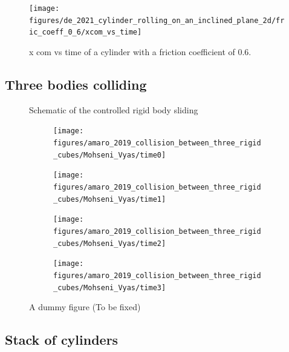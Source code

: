 \documentclass[preprint,12pt]{elsarticle}
\begin{document}
\begin{figure}[!htpb]
  \centering
  \texttt{[image: figures/de\_2021\_cylinder\_rolling\_on\_an\_inclined\_plane\_2d/fric\_coeff\_0\_6/xcom\_vs\_time]}
  \caption{x com vs time of a cylinder with a friction coefficient of $0.6$.}
\label{fig:cylinder-xcom-vs-time-fric-0-6}
\end{figure}


\FloatBarrier%
\subsection{Three bodies colliding}
\label{sec:three-bodies-colliding}


\begin{figure}[!htpb]
  \centering
  \caption{Schematic of the controlled rigid body sliding}
\label{fig:schematic-controlled-rigid-body-sliding}
\end{figure}


\begin{figure}[!htpb]
  \centering
  \begin{subfigure}{0.48\textwidth}
    \centering
    \texttt{[image: figures/amaro\_2019\_collision\_between\_three\_rigid\_cubes/Mohseni\_Vyas/time0]}
  \end{subfigure}
  \begin{subfigure}{0.48\textwidth}
    \centering
    \texttt{[image: figures/amaro\_2019\_collision\_between\_three\_rigid\_cubes/Mohseni\_Vyas/time1]}
  \end{subfigure}

  \begin{subfigure}{0.48\textwidth}
    \centering
    \texttt{[image: figures/amaro\_2019\_collision\_between\_three\_rigid\_cubes/Mohseni\_Vyas/time2]}
  \end{subfigure}
  \begin{subfigure}{0.48\textwidth}
    \centering
    \texttt{[image: figures/amaro\_2019\_collision\_between\_three\_rigid\_cubes/Mohseni\_Vyas/time3]}
  \end{subfigure}
\caption{A dummy figure (To be fixed)}
\label{fig:snapshots-three-cubes-colliding}
\end{figure}
%


\FloatBarrier%
\subsection{Stack of cylinders}
\label{sec:stack-of-cylinders}
\end{document}
